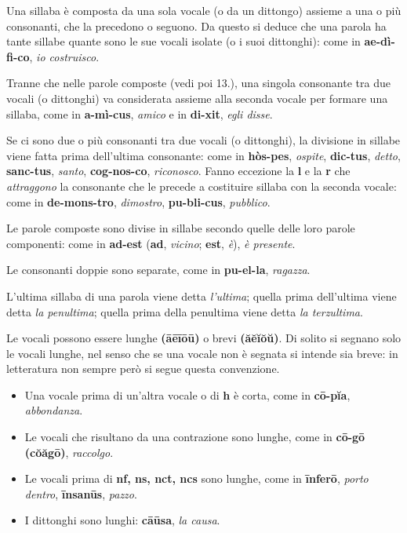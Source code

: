 \documentclass[nols]{tufte-handout}
\newcommand{\textls}[2][5]{%
    \begingroup\addfontfeatures{LetterSpace=#1}#2\endgroup
  }
\renewcommand{\smallcapsspacing}[1]{\textls[10]{#1}}
\renewcommand{\textsc}[1]{\smallcapsspacing{\textsmallcaps{#1}}}
\begin{document}
 Una sillaba è composta da una sola vocale (o da un dittongo) assieme a una o più consonanti, che la precedono o seguono. Da questo si deduce che una parola ha tante sillabe quante sono le sue vocali isolate (o i suoi dittonghi): come in \textbf{ae-dì-fi-co}, \textit{io costruisco}.

 Tranne che nelle parole composte (vedi poi 13.), una singola consonante tra due vocali (o dittonghi) va considerata assieme alla seconda vocale per formare una sillaba, come in \textbf{a-mì-cus}, \textit{amico} e in \textbf{di-xit}, \textit{egli disse}.

 Se ci sono due o più consonanti tra due vocali (o dittonghi), la divisione in sillabe viene fatta prima dell'ultima consonante: come in \textbf{hòs-pes}, \textit{ospite}, \textbf{dic-tus}, \textit{detto}, \textbf{sanc-tus}, \textit{santo}, \textbf{cog-nos-co}, \textit{riconosco}. Fanno eccezione la \textbf{l} e la \textbf{r} che \textit{attraggono} la consonante che le precede a costituire sillaba con la seconda vocale: come in \textbf{de-mons-tro}, \textit{dimostro},  \textbf{pu-bli-cus}, \textit{pubblico}.

 Le parole composte sono divise in sillabe secondo quelle delle loro parole componenti: come in \textbf{ad-est} (\textbf{ad}, \textit{vicino}; \textbf{est}, \textit{è}), \textit{è presente}.

 Le consonanti doppie sono separate, come in \textbf{pu-el-la}, \textit{ragazza}.

 L'ultima sillaba di una parola viene detta \textit{l'ultima}; quella prima dell'ultima viene detta \textit{la penultima}; quella prima della penultima viene detta \textit{la terzultima}.

 Le vocali possono essere lunghe \textbf{(āēīōū)} o brevi \textbf{(ăĕĭŏŭ)}. Di solito si segnano solo le vocali lunghe, nel senso che se una vocale non è segnata si intende sia breve: in letteratura non sempre però si segue questa convenzione. 

\begin{itemize}
\item[\textsc{1.}] Una vocale prima di un'altra vocale o di \textbf{h} è corta, come in \textbf{cō-pĭa}, \textit{abbondanza}. 
\item[\textsc{2.}] Le vocali che risultano da una contrazione sono lunghe, come in \textbf{cō-gō (cŏăgō)}, \textit{raccolgo}. 
\item[\textsc{3.}] Le vocali prima di \textbf{nf, ns, nct, ncs} sono lunghe, come in \textbf{īnferō}, \textit{porto dentro}, \textbf{īnsanūs}, \textit{pazzo}.  
\item[\textsc{4.}] I dittonghi sono lunghi: \textbf{cāūsa}, \textit{la causa}. 
\end{itemize} 
\end{document}
